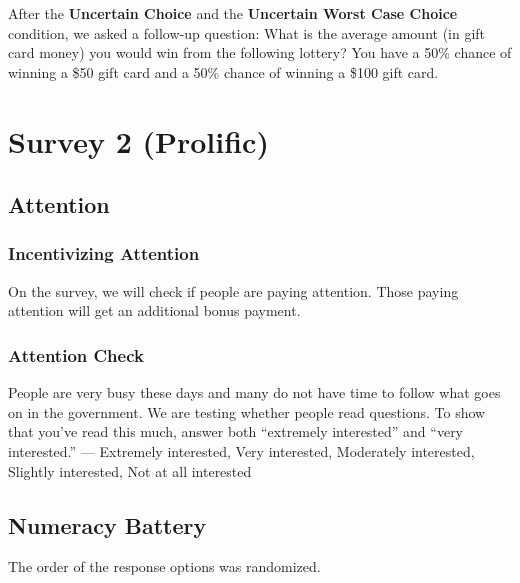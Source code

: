 \documentclass[12pt, letterpaper]{article}
\begin{document}
After the \textbf{Uncertain Choice} and the \textbf{Uncertain Worst Case Choice} condition, we asked a follow-up question:  What is the average amount (in gift card money) you would win from the following lottery? You have a 50\% chance of winning a \$50 gift card and a 50\% chance of winning a \$100 gift card.

\section{Survey 2 (Prolific)}

\subsection{Attention}

\subsubsection{Incentivizing Attention}
On the survey, we will check if people are paying attention. Those paying attention will get an additional bonus payment.

\subsubsection{Attention Check}
People are very busy these days and many do not have time to follow what goes on in the government. We are testing whether people read questions. To show that you've read this much, answer both ``extremely interested'' and ``very interested.'' --- Extremely interested, Very interested,  Moderately interested, Slightly interested, Not at all interested

\subsection{Numeracy Battery}

The order of the response options was randomized.
\end{document}
